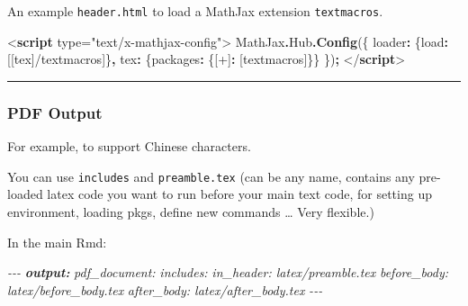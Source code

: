 \documentclass[
  a4paper,
  twoside,
  openright]{book}
\newenvironment{Shaded}{\begin{snugshade}}{\end{snugshade}}
\newcommand{\AnnotationTok}[1]{\textcolor[rgb]{0.56,0.35,0.01}{\textbf{\textit{#1}}}}
\newcommand{\AttributeTok}[1]{\textcolor[rgb]{0.13,0.29,0.53}{#1}}
\newcommand{\CommentTok}[1]{\textcolor[rgb]{0.56,0.35,0.01}{\textit{#1}}}
\newcommand{\DataTypeTok}[1]{\textcolor[rgb]{0.13,0.29,0.53}{#1}}
\newcommand{\FunctionTok}[1]{\textcolor[rgb]{0.13,0.29,0.53}{\textbf{#1}}}
\newcommand{\KeywordTok}[1]{\textcolor[rgb]{0.13,0.29,0.53}{\textbf{#1}}}
\newcommand{\NormalTok}[1]{#1}
\newcommand{\OperatorTok}[1]{\textcolor[rgb]{0.81,0.36,0.00}{\textbf{#1}}}
\newcommand{\OtherTok}[1]{\textcolor[rgb]{0.56,0.35,0.01}{#1}}
\newcommand{\StringTok}[1]{\textcolor[rgb]{0.31,0.60,0.02}{#1}}
\theoremstyle{definition}
\theoremstyle{definition}
\theoremstyle{definition}
\theoremstyle{definition}
\theoremstyle{remark}
\begin{document}
An example \texttt{header.html} to load a MathJax extension \texttt{textmacros}.

\begin{Shaded}
\begin{Highlighting}[]
\DataTypeTok{\textless{}}\KeywordTok{script}\OtherTok{ type=}\StringTok{"text/x{-}mathjax{-}config"}\DataTypeTok{\textgreater{}}
\NormalTok{  MathJax}\OperatorTok{.}\AttributeTok{Hub}\OperatorTok{.}\FunctionTok{Config}\NormalTok{(\{ }
    \DataTypeTok{loader}\OperatorTok{:}\NormalTok{ \{}\DataTypeTok{load}\OperatorTok{:}\NormalTok{ [}\StringTok{\textquotesingle{}[tex]/textmacros\textquotesingle{}}\NormalTok{]\}}\OperatorTok{,}
    \DataTypeTok{tex}\OperatorTok{:}\NormalTok{ \{}\DataTypeTok{packages}\OperatorTok{:}\NormalTok{ \{}\StringTok{\textquotesingle{}[+]\textquotesingle{}}\OperatorTok{:}\NormalTok{ [}\StringTok{\textquotesingle{}textmacros\textquotesingle{}}\NormalTok{]\}\}}
\NormalTok{  \})}\OperatorTok{;}
\DataTypeTok{\textless{}/}\KeywordTok{script}\DataTypeTok{\textgreater{}}
\end{Highlighting}
\end{Shaded}

\begin{center}\rule{0.5\linewidth}{0.5pt}\end{center}

\subsubsection*{PDF Output}\label{pdf-output}

For example, to support Chinese characters.

You can use \texttt{includes} and \texttt{preamble.tex} (can be any name, contains any pre-loaded latex code you want to run before your main text code, for setting up environment, loading pkgs, define new commands \ldots{} Very flexible.)

In the main Rmd:

\begin{Shaded}
\begin{Highlighting}[]
\CommentTok{{-}{-}{-}}
\AnnotationTok{output:}
\CommentTok{  pdf\_document:}
\CommentTok{    includes:}
\CommentTok{      in\_header: latex/preamble.tex}
\CommentTok{      before\_body: latex/before\_body.tex}
\CommentTok{      after\_body: latex/after\_body.tex}
\CommentTok{{-}{-}{-}}
\end{Highlighting}
\end{Shaded}
\end{document}
